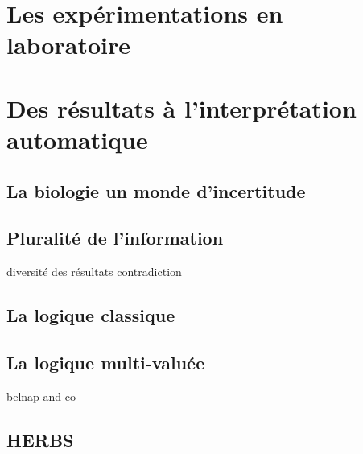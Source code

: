 \section{Les expérimentations en laboratoire}

\section{Des résultats à l'interprétation automatique}
\subsection{La biologie un monde d'incertitude}
\subsection{Pluralité de l'information}
diversité des résultats contradiction
\subsection{La logique classique}
\subsection{La logique multi-valuée}
belnap and co
\subsection{HERBS}

